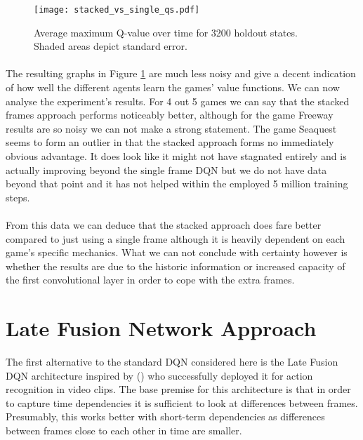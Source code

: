 \begin{figure}[htpb]
  \centering
  \texttt{[image: stacked\_vs\_single\_qs.pdf]}
  \caption{
    Average maximum Q-value over time for 3200 holdout states.
    Shaded areas depict standard error.
  }
  \label{fig:stacked_vs_single_qs}
\end{figure}

\paragraph{}
The resulting graphs in Figure \ref{fig:stacked_vs_single_qs}
are much less noisy
and give a decent indication of how well the
different agents learn the games' value functions.
We can now analyse the experiment's results.
For 4 out 5 games we can say that the stacked frames approach
performs noticeably better,
although for the game Freeway results are so noisy
we can not make a strong statement.
The game Seaquest seems to form an outlier
in that the stacked approach forms no immediately obvious advantage.
It does look like it might not have stagnated entirely
and is actually improving beyond the single frame DQN
but we do not have data beyond that point
and it has not helped within the employed 5 million training steps.

\paragraph{}
From this data we can deduce that the stacked approach does
fare better compared to just using a single frame
although it is heavily dependent on each game's specific mechanics.
What we can not conclude with certainty however
is whether the results are due to the historic information
or increased capacity of the first convolutional layer
in order to cope with the extra frames.


\section{Late Fusion Network Approach}
\label{sec:late_fusion_network_approach}
The first alternative to the standard DQN
considered here is
the Late Fusion DQN architecture
inspired by \citeauthor{Karpathy2014} (\citeyear{Karpathy2014})
who successfully deployed it for
action recognition in video clips.
The base premise for this architecture
is that in order to capture time dependencies
it is sufficient to look at differences
between frames.
Presumably,
this works better with short-term dependencies
as differences between frames close to each other in time
are smaller.

